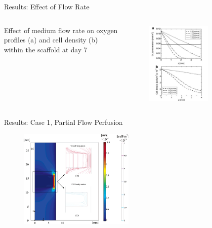 \documentclass[11pt,t]{beamer}
\begin{document}
\begin{frame}[fragile]{Results: Effect of Flow Rate}  

	\begin{columns}[t]
		\begin{column}{.5\textwidth}
Effect of medium flow rate on oxygen profiles (a) and cell density (b) within the scaffold at day 7
	
 
		\end{column}
		\begin{column}{.5\textwidth}
			\vspace{-30pt}
			\begin{figure}
			\centering
			\includegraphics[width=0.7\textwidth]{math_tot_flow}
			
			\end{figure}
		\end{column}
	\end{columns}	
		
\end{frame}


\begin{frame}[fragile]{Results: Case 1, Partial  Flow Perfusion}  
			
			\begin{figure}
			\centering
			\includegraphics[width=0.5\textwidth]{math_par_vel}
			
			\end{figure}
\end{frame}
\end{document}
